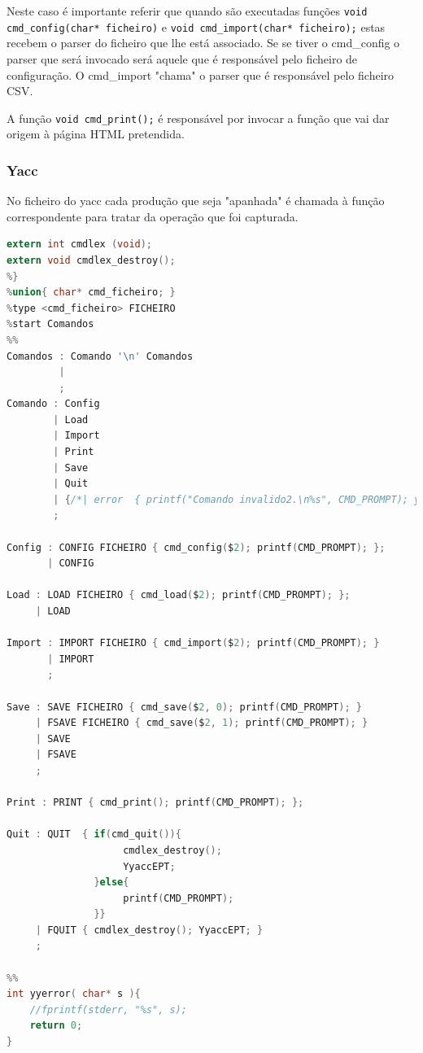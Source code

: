 \documentclass[11pt, a4paper, oneside]{article}
\begin{document}
Neste caso é importante referir que quando são executadas funções \texttt{void cmd\_config(char* ficheiro)} e \texttt{void cmd\_import(char* ficheiro);} estas recebem o parser do ficheiro que lhe está associado. Se se tiver o cmd\_config o parser que será invocado será aquele que é responsável pelo ficheiro de configuração. O cmd\_import "chama" o parser que é responsável pelo ficheiro CSV.

A função \texttt{void cmd\_print();} é responsável por invocar a função que vai dar origem à página HTML pretendida.
\subsubsection{\textsf{Yacc}}

No ficheiro do \textsf{yacc} cada produção que seja "apanhada" é chamada à função correspondente para tratar da operação que foi capturada.

\begin{lstlisting}[language=C, caption={Yacc do ficheiro cmd.}]
extern int cmdlex (void);
extern void cmdlex_destroy();
%}
%union{ char* cmd_ficheiro; }
%type <cmd_ficheiro> FICHEIRO
%start Comandos
%%
Comandos : Comando '\n' Comandos
         | 
         ;
Comando : Config
        | Load
        | Import
        | Print
        | Save
        | Quit
        | {/*| error  { printf("Comando invalido2.\n%s", CMD_PROMPT); yyclearin; yyerrok; }*/}
        ;

Config : CONFIG FICHEIRO { cmd_config($2); printf(CMD_PROMPT); };
       | CONFIG

Load : LOAD FICHEIRO { cmd_load($2); printf(CMD_PROMPT); };
     | LOAD

Import : IMPORT FICHEIRO { cmd_import($2); printf(CMD_PROMPT); }
       | IMPORT
       ;

Save : SAVE FICHEIRO { cmd_save($2, 0); printf(CMD_PROMPT); }
     | FSAVE FICHEIRO { cmd_save($2, 1); printf(CMD_PROMPT); }
     | SAVE
     | FSAVE
     ;

Print : PRINT { cmd_print(); printf(CMD_PROMPT); };

Quit : QUIT  { if(cmd_quit()){
                    cmdlex_destroy();
                    YyaccEPT;
               }else{
                    printf(CMD_PROMPT);
               }}
     | FQUIT { cmdlex_destroy(); YyaccEPT; }
     ;

%%
int yyerror( char* s ){
    //fprintf(stderr, "%s", s);
    return 0;
}
\end{lstlisting} 
\end{document}
